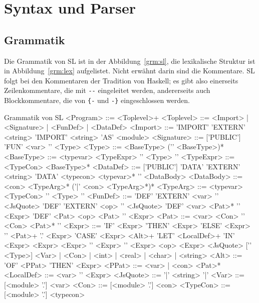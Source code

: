 \documentclass[runningheads]{llncs}
\begin{document}
\section{Syntax und Parser}
\label{sec:syntax}

\subsection{Grammatik}
\label{sec:grammar}

Die Grammatik von SL ist in der Abbildung~\ref{grm:sl}, die
lexikalische Struktur ist in Abbildung~\ref{grm:lex} aufgelistet. Nicht erwähnt
darin sind die Kommentare.  SL folgt bei den Kommentaren der Tradition
von Haskell; es gibt also einerseits Zeilenkommentare,
die  mit \verb|--| eingeleitet werden, andererseits auch Blockkommentare, die
von \verb:{-: und \verb:-}: eingeschlossen werden.

\begin{grammarfigure}[grm:sl]{Grammatik von SL}
<Program>   ::= <Toplevel>+
<Toplevel>  ::= <Import> | <Signature> | <FunDef> | <DataDef>
<Import>    ::= 'IMPORT' 'EXTERN' <string>
           \alt 'IMPORT' <string> 'AS' <module>
<Signature> ::= ['PUBLIC'] 'FUN' <var> '\colon' <Type>
<Type>      ::= <BaseType> ('\arrow' <BaseType>)*
<BaseType>  ::= <typevar> 
           \alt <TypeExpr> 
           \alt '\open' <Type> '\close'
<TypeExpr>  ::= <TypeCon> <BaseType>*
<DataDef>   ::= ['PUBLIC'] 'DATA' 'EXTERN' <string>
           \alt ['PUBLIC'] 'DATA' <typecon> <typevar>* '\eq' <DataBody>
<DataBody>  ::= <con> <TypeArg>* ('\bar' <con> <TypeArg>*)*
<TypeArg>   ::= <typevar>
           \alt <TypeCon>
           \alt '\open' <Type> '\close'
<FunDef>    ::= 'DEF' 'EXTERN' <var> '\eq' <JsQuote>
           \alt 'DEF' 'EXTERN' <op> '\eq' <JsQuote>
           \alt 'DEF' <var> <Pat>* '\eq' <Expr>
           \alt 'DEF' <Pat> <op> <Pat> '\eq' <Expr>
<Pat>       ::= <var>
           \alt <Con>
           \alt '\open' <Con> <Pat>* '\close'
<Expr>      ::= 'IF' <Expr> 'THEN' <Expr> 'ELSE' <Expr>
           \alt '\lam' <Pat>+ '.' <Expr>
           \alt 'CASE' <Expr> <Alt>+
           \alt 'LET' <LocalDef>+ 'IN' <Expr>
           \alt <Expr> <Expr>
           \alt '\open' <Expr> '\close'
           \alt <Expr> <op> <Expr>
           \alt <JsQuote> ['\colon' <Type>]
           \alt <Var> | <Con> | <int> | <real> | <char> | <string>
<Alt>       ::= 'OF' <PPat> 'THEN' <Expr>
<PPat>      ::= <var> | <con> <Pat>*
<LocalDef>  ::= <var> '\eq' <Expr>
<JsQuote>   ::= '\bropen\bar' <string> '\bar\brclose'
<Var>       ::= [<module> '.'] <var>
<Con>       ::= [<module> '.'] <con>
<TypeCon>   ::= [<module> '.'] <typecon>
\end{grammarfigure}
\end{document}

